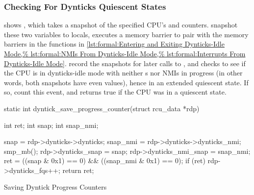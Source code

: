 \subsubsection{Checking For Dynticks Quiescent States}
\label{sec:formal:Checking For Dynticks Quiescent States}

\begin{fcvref}
shows , which takes a snapshot
of the specified CPU's  and 
counters.
 snapshot these two variables to locals, 
executes a memory barrier to pair with the memory barriers in the functions in
\cref{lst:formal:Entering and Exiting Dynticks-Idle Mode,%
lst:formal:NMIs From Dynticks-Idle Mode,%
lst:formal:Interrupts From Dynticks-Idle Mode}.
 record the snapshots for later calls to
,
and  checks to see if the CPU is in dynticks-idle mode with
neither \IRQ s nor NMIs in progress (in other words, both snapshots
have even values), hence in an extended quiescent state.
If so,  count this event, and  returns
true if the CPU was in a quiescent state.
\end{fcvref}

\begin{listing}[tbp]
\begin{fcvlabel}
\begin{VerbatimL}[commandchars=\\\[\]]
static int
dyntick_save_progress_counter(struct rcu_data *rdp)
{
	int ret;
	int snap;
	int snap_nmi;

	snap = rdp->dynticks->dynticks;		\lnlbl[snap]
	snap_nmi = rdp->dynticks->dynticks_nmi;	\lnlbl[snapn]
	smp_mb();				\lnlbl[mb]
	rdp->dynticks_snap = snap;		
	rdp->dynticks_nmi_snap = snap_nmi;	
	ret = ((snap & 0x1) == 0) && ((snap_nmi & 0x1) == 0); 
	if (ret)				\lnlbl[cnt:b]
		rdp->dynticks_fqs++;		\lnlbl[cnt:e]
	return ret;				\lnlbl[ret]
}
\end{VerbatimL}
\end{fcvlabel}
\caption{Saving Dyntick Progress Counters}
\label{lst:formal:Saving Dyntick Progress Counters}
\end{listing}

